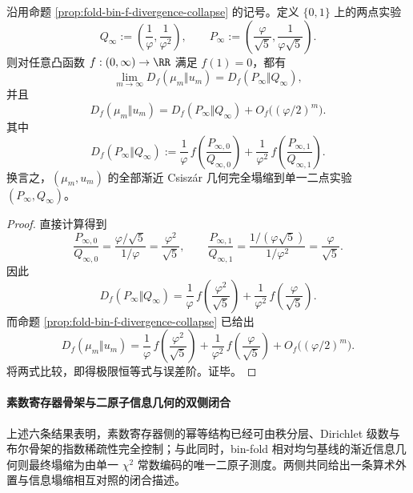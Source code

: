\begin{proposition}\label{prop:xi-foldbin-f-divergence-two-point-experiment}
沿用命题 \ref{prop:fold-bin-f-divergence-collapse} 的记号。定义 \(\{0,1\}\) 上的两点实验
\[
Q_\infty:=\left(\frac1\varphi,\frac1{\varphi^2}\right),
\qquad
P_\infty:=\left(\frac{\varphi}{\sqrt5},\frac{1}{\varphi\sqrt5}\right).
\]
则对任意凸函数 \(f:(0,\infty)\to\RR\) 满足 \(f(1)=0\)，都有
\[
\boxed{\;
\lim_{m\to\infty}D_f(\mu_m\Vert u_m)
=
D_f(P_\infty\Vert Q_\infty),\;}
\]
并且
\[
\boxed{\;
D_f(\mu_m\Vert u_m)
=
D_f(P_\infty\Vert Q_\infty)
+O_f\bigl((\varphi/2)^m\bigr).\;}
\]
其中
\[
D_f(P_\infty\Vert Q_\infty)
:=
\frac1\varphi\,f\!\left(\frac{P_{\infty,0}}{Q_{\infty,0}}\right)
+\frac1{\varphi^2}\,f\!\left(\frac{P_{\infty,1}}{Q_{\infty,1}}\right).
\]
换言之，\((\mu_m,u_m)\) 的全部渐近 Csisz\'ar 几何完全塌缩到单一二点实验 \((P_\infty,Q_\infty)\)。
\end{proposition}
\begin{proof}
直接计算得到
\[
\frac{P_{\infty,0}}{Q_{\infty,0}}
=
\frac{\varphi/\sqrt5}{1/\varphi}
=
\frac{\varphi^2}{\sqrt5},
\qquad
\frac{P_{\infty,1}}{Q_{\infty,1}}
=
\frac{1/(\varphi\sqrt5)}{1/\varphi^2}
=
\frac{\varphi}{\sqrt5}.
\]
因此
\[
D_f(P_\infty\Vert Q_\infty)
=
\frac1\varphi\,f\!\left(\frac{\varphi^2}{\sqrt5}\right)
+\frac1{\varphi^2}\,f\!\left(\frac{\varphi}{\sqrt5}\right).
\]
而命题 \ref{prop:fold-bin-f-divergence-collapse} 已给出
\[
D_f(\mu_m\Vert u_m)
=
\frac1\varphi\,f\!\left(\frac{\varphi^2}{\sqrt5}\right)
+\frac1{\varphi^2}\,f\!\left(\frac{\varphi}{\sqrt5}\right)
+O_f\bigl((\varphi/2)^m\bigr).
\]
将两式比较，即得极限恒等式与误差阶。证毕。
\end{proof}

\paragraph{素数寄存器骨架与二原子信息几何的双侧闭合}
上述六条结果表明，素数寄存器侧的幂等结构已经可由秩分层、Dirichlet 级数与布尔骨架的指数稀疏性完全控制；与此同时，bin-fold 相对均匀基线的渐近信息几何则最终塌缩为由单一 \(\chi^2\) 常数编码的唯一二原子测度。两侧共同给出一条算术外置与信息塌缩相互对照的闭合描述。

\endinput
